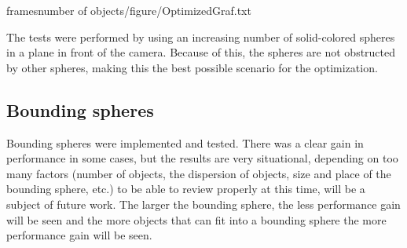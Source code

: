 			
			\begin{table}
			\centering
				{frames}{number of objects}{/figure/OptimizedGraf.txt}
			\end{table}

			The tests were performed by using an increasing number of
			solid-colored spheres in a plane in front of the camera. Because of
			this, the spheres are not obstructed by other spheres, making this
			the best possible scenario for the optimization.

		\subsection{Bounding spheres}

			Bounding spheres were implemented and tested. There was a clear
			gain in performance in some cases, but the results are very
			situational, depending on too many factors
			(number of objects, the dispersion of objects, size and place of
			the bounding sphere, etc.) to be able to review properly at this time, will be a subject of future work.  The larger the bounding sphere, the
			less performance gain will be seen and the more objects that can
			fit into a bounding sphere the more performance gain will be seen. 
